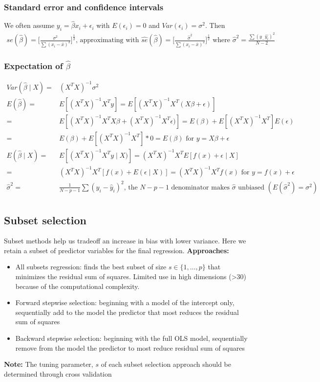 \documentclass{article}
\begin{document}
\subsubsection{Standard error and confidence intervals}
We often assume $y_i = \hat{\beta}x_i + \epsilon_i$ with $E(\epsilon_i) = 0$ and $Var(\epsilon_i) = \sigma^2$. Then
\begin{align*}
  se(\hat{\beta}) = \biggl[ \frac{\sigma^2}{\sum(x_i - \bar{x})^2}\biggr]^{\frac{1}{2}} \textrm{, approximating with } \hat{se}(\hat{\beta}) = \biggl[ \frac{\hat{\sigma}^2}{\sum(x_i - \bar{x})^2}\biggr]^{\frac{1}{2}} \textrm{ where } \hat{\sigma}^2 = \frac{\sum(y_ - \hat{y_i})^2}{N-2}
\end{align*}

\subsubsection{Expectation of $\hat{\beta}$}
\begin{align*}
  Var(\hat{\beta} \mid X) =& (X^TX)^{-1}\sigma^2\\
  E(\hat{\beta}) =& E[(X^TX)^{-1}X^Ty] = E[(X^TX)^{-1}X^T(X\beta + \epsilon)]\\
  =& E[(X^TX)^{-1}X^TX\beta + (X^TX)^{-1}X^T\epsilon)] = E(\beta) + E[(X^TX)^{-1}X^T]E(\epsilon)\\
  =& E(\beta) + E[(X^TX)^{-1}X^T]*0 = E(\beta) \textrm{ for } y = X\beta + \epsilon\\
  E(\hat{\beta}\mid X) =& E[(X^TX)^{-1}X^Ty \mid X)] = (X^TX)^{-1}X^TE[f(x) + \epsilon \mid X]\\
  =& (X^TX)^{-1}X^T[f(x) + E(\epsilon \mid X)] = (X^TX)^{-1}X^Tf(x) \textrm{ for } y=f(x) + \epsilon\\
  \hat{\sigma}^2 =& \frac{1}{N - p - 1}\sum(y_i - \hat{y}_i)^2 \textrm{, the $N-p-1$ denominator makes $\hat{\sigma}$ unbiased } (E(\hat{\sigma}^2) = \sigma^2)\\
\end{align*}

\subsection{Subset selection}
Subset methods help us tradeoff an increase in bias with lower variance. Here we retain a subset of predictor variables for the final regression.
\textbf{Approaches:}
\begin{itemize}
  \item All subsets regression: finds the best subset of size $s \in \{1, \dots, p\}$ that minimizes the residual sum of squares. Limited use in high dimensions (>30) because of the computational complexity. 
  \item Forward stepwise selection: beginning with a model of the intercept only, sequentially add to the model the predictor that most reduces the residual sum of squares
  \item Backward stepwise selection: beginning with the full OLS model, sequentially remove from the model the predictor to most reduce residual sum of squares
\end{itemize}
\textbf{Note:} The tuning parameter, $s$ of each subset selection approach should be determined through cross validation
\end{document}
